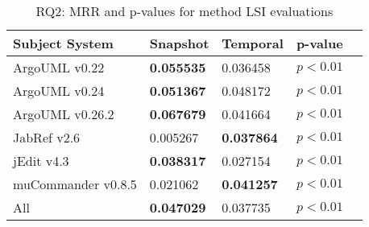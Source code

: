 
\begin{table}[t]
\renewcommand{\arraystretch}{1.3}
\footnotesize
\centering
\caption{RQ2: MRR and p-values for method LSI evaluations}
\begin{tabular}{l|ll|ll}
   \toprule
    Subject System & Snapshot & Temporal & p-value  \\
    \midrule

ArgoUML v0.22 & {\bf 0.055535 } & 0.036458 & $p < 0.01$ \\
ArgoUML v0.24 & {\bf 0.051367 } & 0.048172 & $p < 0.01$ \\
ArgoUML v0.26.2 & {\bf 0.067679 } & 0.041664 & $p < 0.01$ \\
JabRef v2.6 & 0.005267 & {\bf 0.037864 } & $p < 0.01$ \\
jEdit v4.3 & {\bf 0.038317 } & 0.027154 & $p < 0.01$ \\
muCommander v0.8.5 & 0.021062 & {\bf 0.041257 } & $p < 0.01$ \\
\midrule
All & {\bf 0.047029 } & 0.037735 & $p < 0.01$ \\

    \bottomrule
\end{tabular}
\label{table:rq2:method:lsi}
\end{table}

